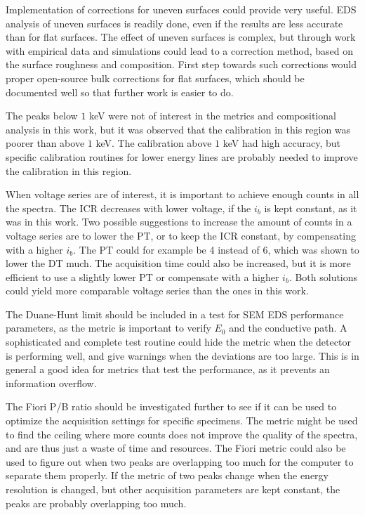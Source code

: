 Implementation of corrections for uneven surfaces could provide very useful.
EDS analysis of uneven surfaces is readily done, even if the results are less accurate than for flat surfaces.
The effect of uneven surfaces is complex, but through work with empirical data and simulations could lead to a correction method, based on the surface roughness and composition.
First step towards such corrections would proper open-source bulk corrections for flat surfaces, which should be documented well so that further work is easier to do.

The peaks below $1$ keV were not of interest in the metrics and compositional analysis in this work, but it was observed that the calibration in this region was poorer than above $1$ keV.
The calibration above $1$ keV had high accuracy, but specific calibration routines for lower energy lines are probably needed to improve the calibration in this region.

When voltage series are of interest, it is important to achieve enough counts in all the spectra.
The ICR decreases with lower voltage, if the $i_b$ is kept constant, as it was in this work.
Two possible suggestions to increase the amount of counts in a voltage series are to lower the PT, or to keep the ICR constant, by compensating with a higher $i_b$.
The PT could for example be 4 instead of 6, which was shown to lower the DT much.
The acquisition time could also be increased, but it is more efficient to use a slightly lower PT or compensate with a higher $i_b$.
Both solutions could yield more comparable voltage series than the ones in this work.

The Duane-Hunt limit should be included in a test for SEM EDS performance parameters, as the metric is important to verify $E_0$ and the conductive path.
A sophisticated and complete test routine could hide the metric when the detector is performing well, and give warnings when the deviations are too large.
This is in general a good idea for metrics that test the performance, as it prevents an information overflow.

The Fiori P/B ratio should be investigated further to see if it can be used to optimize the acquisition settings for specific specimens.
The metric might be used to find the ceiling where more counts does not improve the quality of the spectra, and are thus just a waste of time and resources.
The Fiori metric could also be used to figure out when two peaks are overlapping too much for the computer to separate them properly.
If the metric of two peaks change when the energy resolution is changed, but other acquisition parameters are kept constant, the peaks are probably overlapping too much.


